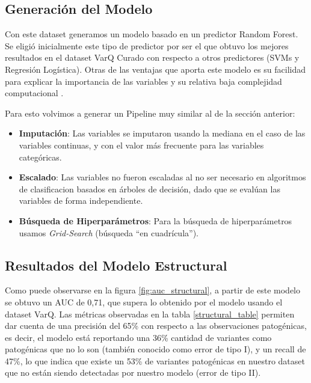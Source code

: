 \newpage


\subsection{Generación del Modelo}

Con este dataset generamos un modelo basado en un predictor Random Forest. 
Se eligió inicialmente este tipo de predictor por ser el que obtuvo los mejores resultados en el dataset VarQ Curado con respecto a otros predictores (SVMs y Regresión Logística). Otras de las ventajas que aporta este modelo es su facilidad para explicar la importancia de las variables y su relativa baja complejidad computacional \todo{[Citar?]}. 

Para esto volvimos a generar un Pipeline muy similar al de la sección anterior:

\begin{itemize}
 
\item \textbf{Imputación}: Las variables se imputaron usando la mediana en el caso de las variables continuas, y con el valor más frecuente para las variables categóricas. 
\item \textbf{Escalado}: Las variables no fueron escaladas al no ser necesario en algoritmos de clasificacion basados en árboles de decisión, dado que se evalúan las variables de forma independiente. 
\item \textbf{Búsqueda de Hiperparámetros}: Para la búsqueda de hiperparámetros usamos \textit{Grid-Search} (búsqueda ``en cuadrícula'').
\end{itemize}


\subsection{Resultados del Modelo Estructural}

Como puede observarse en la figura \ref{fig:auc_structural}, a partir de este modelo se obtuvo un AUC de 0,71, que supera lo obtenido por el modelo usando el dataset VarQ. Las métricas observadas en la tabla \ref{structural_table} permiten dar cuenta de una precisión del 65\% con respecto a las observaciones patogénicas, es decir, el modelo está reportando una 36\% cantidad de variantes como patogénicas que no lo son (también conocido como error de tipo I), y un recall de 47\%, lo que indica que existe un 53\% de variantes patogénicas en nuestro dataset que no están siendo detectadas por nuestro modelo (error de tipo II). 

